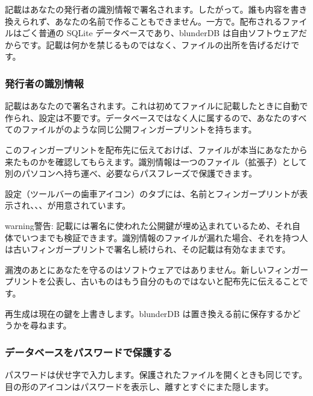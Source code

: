 \documentclass[letterpaper,10pt,dvipdfmx]{sphinxmanual}
\begin{document}
\sphinxAtStartPar
記載はあなたの発行者の識別情報で署名されます。したがって。誰も内容を書き換えられず、あなたの名前で作ることもできません。一方で。配布されるファイルはごく普通の SQLite データベースであり、blunderDB は自由ソフトウェアだからです。記載は何かを禁じるものではなく、ファイルの出所を告げるだけです。


\subsubsection{発行者の識別情報}
\label{\detokenize{manuel:identite-d-emetteur}}
\sphinxAtStartPar
記載はあなたので署名されます。これは初めてファイルに記載したときに自動で作られ、設定は不要です。データベースではなく人に属するので、あなたのすべてのファイルがのような同じ公開フィンガープリントを持ちます。

\sphinxAtStartPar
このフィンガープリントを配布先に伝えておけば、ファイルが本当にあなたから来たものかを確認してもらえます。識別情報は一つのファイル（拡張子）として別のパソコンへ持ち運べ、必要ならパスフレーズで保護できます。

\sphinxAtStartPar
設定（ツールバーの歯車アイコン）のタブには、名前とフィンガープリントが表示され、、、が用意されています。

\begin{sphinxadmonition}{warning}{警告:}
\sphinxAtStartPar
{}記載には署名に使われた公開鍵が埋め込まれているため、それ自体でいつまでも検証できます。識別情報のファイルが漏れた場合、それを持つ人は古いフィンガープリントで署名し続けられ、その記載は有効なままです。

\sphinxAtStartPar
漏洩のあとにあなたを守るのはソフトウェアではありません。新しいフィンガープリントを公表し、古いものはもう自分のものではないと配布先に伝えることです。

\sphinxAtStartPar
再生成は現在の鍵を上書きします。blunderDB は置き換える前に保存するかどうかを尋ねます。
\end{sphinxadmonition}


\subsubsection{データベースをパスワードで保護する}
\label{\detokenize{manuel:proteger-une-base-par-un-mot-de-passe}}
\sphinxAtStartPar
パスワードは伏せ字で入力します。保護されたファイルを開くときも同じです。目の形のアイコンはパスワードを表示し、離すとすぐにまた隠します。
\end{document}
